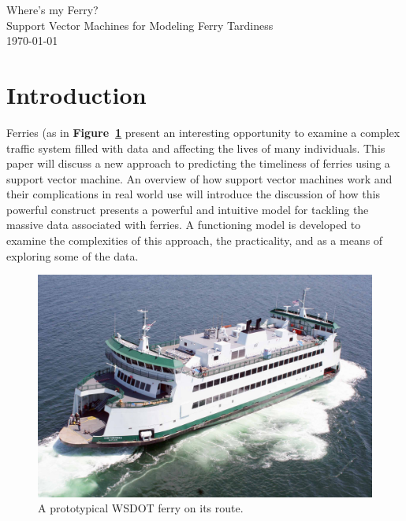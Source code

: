 \documentclass[11pt]{article} %
\begin{document}
\begin{titlepage}
    \vspace*{\fill}
    \begin{center}
      \Huge{Where's my Ferry?}\\[0.5cm]
      \Large{Support Vector Machines for Modeling Ferry Tardiness}\\[0.4cm]
      \today
    \end{center}
    \vspace*{\fill}
  \end{titlepage}
\newpage
\vspace*{\fill}
\tableofcontents
\vspace*{\fill}
\newpage

\section{Introduction}
\label{sec:intro}
Ferries (as in \textbf{Figure~\ref{fig:basicferry}} present an interesting 
opportunity to examine a complex traffic system filled with data and affecting 
the lives of many individuals. This paper will discuss a new approach to predicting 
the timeliness of ferries using a support vector machine.  An overview of how 
support vector machines work and their complications in real world use will 
introduce the discussion of how this powerful construct presents a powerful and 
intuitive model for tackling the massive data associated with ferries.  A 
functioning model is developed to examine the complexities of this
approach, the practicality, and as a means of exploring some of the data.

\begin{figure}[h]
  \centering
  \includegraphics[scale=.15]{images/ferry.jpg}
  \caption{A prototypical WSDOT ferry on its route.}
  \label{fig:basicferry}
\end{figure}
\end{document}
